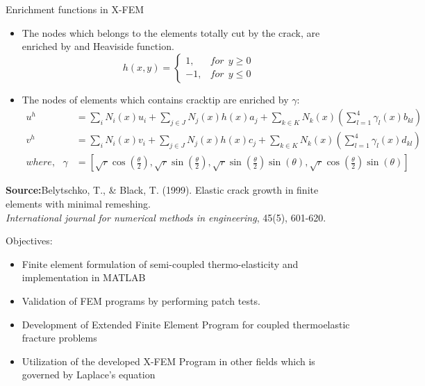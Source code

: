 \documentclass{beamer}
\begin{document}
\begin{frame}[t,fragile]{Enrichment functions in X-FEM}
    \vspace{-.3cm}
     \footnotesize
    \begin{itemize}
         \item The nodes which belongs to the elements totally cut by the crack, are enriched by and Heaviside function.
    $$h(x,y)=\begin{cases}1,&       for ~ ~ y\ge 0\\ -1,&       for~ ~ y\le 0\end{cases}$$ 
\item The nodes of elements which contains cracktip are enriched by $\gamma$:
     \footnotesize
    \begin{align*}
     u^h&=\sum_i N_i(x)u_i+\sum_{j\in J} N_j(x) h(x)a_j+\sum_{k\in K} N_k(x)\left( \sum_{l=1}^{4}\gamma_l(x)b_{kl} \right) \\
    v^h&=\sum_i N_i(x)v_i+\sum_{j\in J} N_j(x) h(x)c_j+\sum_{k\in K} N_k(x)\left( \sum_{l=1}^{4}\gamma_l(x)d_{kl} \right) \\ 
     where,\ \ \ \gamma&=\left[ \sqrt{r}\cos \left( \frac{\theta}{2} \right), \sqrt{r}\sin\left( \frac{\theta}{2} \right),\sqrt{r}\sin\left( \frac{\theta}{2} \right)\sin(\theta),\sqrt{r}\cos\left( \frac{\theta}{2} \right)\sin(\theta)\right] 
\end{align*}
\end{itemize}
\tiny
\hspace{10pt}
\textbf{Source:}Belytschko, T., \& Black, T. (1999). Elastic crack growth in finite elements with minimal remeshing. \\
\vspace{-7pt}
\hspace{10pt}
\emph{International journal for numerical methods in engineering}, 45(5), 601-620.
\end{frame}
\begin{frame}[t,fragile]{Objectives: }
    \begin{itemize}
        \item Finite element formulation of semi-coupled thermo-elasticity and implementation in MATLAB
        \item Validation of FEM programs by performing patch tests.
                  \item Development of Extended Finite Element Program for coupled thermoelastic fracture problems 
                  \item Utilization of the developed X-FEM Program in other fields which is governed by Laplace's equation
                \end{itemize}
\end{frame}
\end{document}
